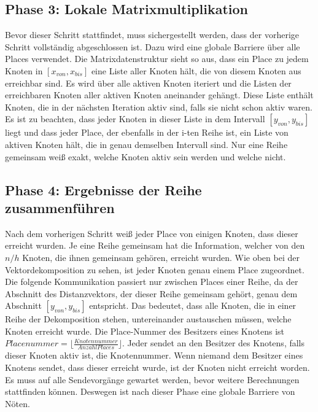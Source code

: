 \subsection{Phase 3: Lokale Matrixmultiplikation} %
\label{ssub:lokale_matrixmultiplikation}
Bevor dieser Schritt stattfindet, muss sichergestellt werden, dass der vorherige Schritt vollständig abgeschlossen ist. Dazu wird eine globale Barriere über alle Places verwendet. Die Matrixdatenstruktur sieht so aus, dass ein Place zu jedem Knoten in $\left[x_{von}, x_{bis} \right]$ eine Liste aller Knoten hält, die von diesem Knoten aus erreichbar sind. Es wird über alle aktiven Knoten iteriert und die Listen der erreichbaren Knoten aller aktiven Knoten aneinander gehängt. Diese Liste enthält Knoten, die in der nächsten Iteration aktiv sind, falls sie nicht schon aktiv waren. Es ist zu beachten, dass jeder Knoten in dieser Liste in dem Intervall $\left[y_{von}, y_{bis} \right]$ liegt und dass jeder Place, der ebenfalls in der i-ten Reihe ist, ein Liste von aktiven Knoten hält, die in genau demselben Intervall sind. Nur eine Reihe gemeinsam weiß exakt, welche Knoten aktiv sein werden und welche nicht.

\subsection{Phase 4: Ergebnisse der Reihe zusammenführen} %
\label{ssub:ergebnisse_der_reihe_zusammenf_hren}
Nach dem vorherigen Schritt weiß jeder Place von einigen Knoten, dass dieser erreicht wurden. Je eine Reihe gemeinsam hat die Information, welcher von den $n/h$ Knoten, die ihnen gemeinsam gehören, erreicht wurden. Wie oben bei der Vektordekomposition zu sehen, ist jeder Knoten genau einem Place zugeordnet. Die folgende Kommunikation passiert nur zwischen Places einer Reihe, da der Abschnitt des Distanzvektors, der dieser Reihe gemeinsam gehört, genau dem Abschnitt $\left[y_{von}, y_{bis} \right]$ entspricht. Das bedeutet, dass alle Knoten, die in einer Reihe der Dekomposition stehen, untereinander austauschen müssen, welche Knoten erreicht wurde. Die Place-Nummer des Besitzers eines Knotens ist $\mathit{Placenummer}=\lfloor\frac{\mathit{Knotennummer}}{\mathit{Anzahl Places}}\rfloor$. Jeder sendet an den Besitzer des Knotens, falls dieser Knoten aktiv ist, die Knotennummer. Wenn niemand dem Besitzer eines Knotens sendet, dass dieser erreicht wurde, ist der Knoten nicht erreicht worden. Es muss auf alle Sendevorgänge gewartet werden, bevor weitere Berechnungen stattfinden können. Deswegen ist nach dieser Phase eine globale Barriere von Nöten.

